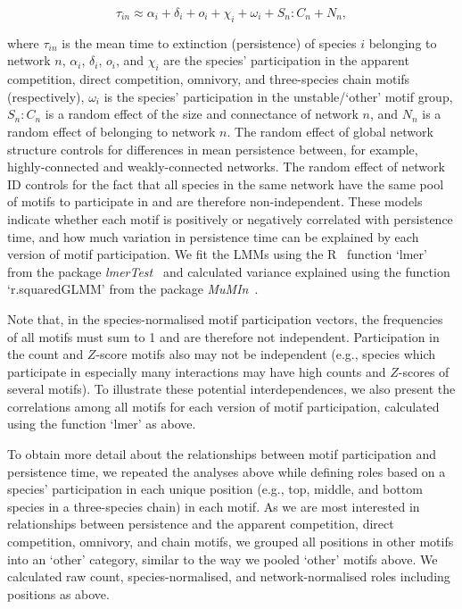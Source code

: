 \documentclass[12pt]{article}
\begin{document}
\begin{spacing}{1.0}
                \begin{equation}
                    \tau_{in} \approx \alpha_{i} + \delta_{i} + o_{i} + \chi_{i} + \omega_{i} + S_{n}:C_{n} +N_n,
                    \label{eq:persistence_motifs}
                \end{equation}

                where $\tau_{in}$ is the mean time to extinction (persistence) of species $i$ belonging to network $n$,  $\alpha_{i}$, $\delta_{i}$, $o_{i}$, and $\chi_{i}$ are the species' participation in the apparent competition, direct competition, omnivory, and three-species chain motifs (respectively), $\omega_{i}$ is the species' participation in the unstable/`other' motif group, $S_{n}:C_{n}$ is a random effect of the size and connectance of network $n$, and $N_n$ is a random effect of belonging to network $n$.
                The random effect of global network structure controls for differences in mean persistence between, for example, highly-connected and weakly-connected networks. 
                The random effect of network ID controls for the fact that all species in the same network have the same pool of motifs to participate in and are therefore non-independent.
                These models indicate whether each motif is positively or negatively correlated with persistence time, and how much variation in persistence time can be explained by each version of motif participation. 
                We fit the LMMs using the R~\citep{R} function `lmer' from the package \emph{lmerTest}~\citep{lmerTest} and calculated variance explained using the function `r.squaredGLMM' from the package \emph{MuMIn}~\citep{MuMIn}.
                
                
                Note that, in the species-normalised motif participation vectors, the frequencies of all motifs must sum to 1 and are therefore not independent. 
                Participation in the count and $Z$-score motifs also may not be independent (e.g., species which participate in especially many interactions may have high counts and $Z$-scores of several motifs).
                To illustrate these potential interdependences, we also present the correlations among all motifs for each version of motif participation, calculated using the function `lmer' as above.
                
                
                To obtain more detail about the relationships between motif participation and persistence time, we repeated the analyses above while defining roles based on a species' participation in each unique position (e.g., top, middle, and bottom species in a three-species chain) in each motif.
                As we are most interested in relationships between persistence and the apparent competition, direct competition, omnivory, and chain motifs, we grouped all  positions in other motifs into an `other' category, similar to the way we pooled `other' motifs above.
                We calculated raw count, species-normalised, and network-normalised roles including positions as above.
                


\end{spacing}
\end{document}
